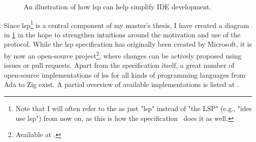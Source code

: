\documentclass[../thesis]{subfiles}
\begin{document}
\begin{figure}
	\begin{center}
	\end{center}
	\caption{An illustration of how \gls{lsp} can help simplify IDE development.}\label{fig:lsp}
\end{figure}

\noindent{}Since \gls{lsp}\footnote{%
	Note that I will often refer to the  as just "\gls{lsp}" instead of "the LSP" (e.g., "\glspl{ide} use \gls{lsp}") from now on, as this is how the specification~\cite{lsp} does it as well.
} is a central component of my master's thesis, I have created a diagram in \cref{fig:lsp} in the hope to strengthen intuitions around the motivation and use of the protocol.
While the \gls{lsp} specification has originally been created by Microsoft, it is by now an open-source project\footnote{
	Available at .
}, where changes can be actively proposed using issues or pull requests.
Apart from the specification itself, a great number of open-source implementations of \glspl{ls} for all kinds of programming languages from Ada to Zig exist.
A partial overview of available implementations is listed at .
\end{document}
